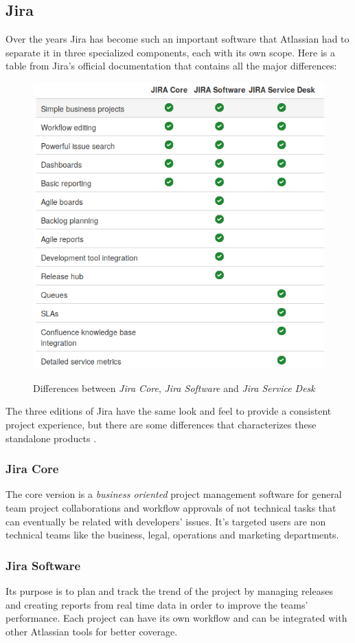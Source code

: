 	\subsection{Jira}
		Over the years Jira has become such an important software that Atlassian had to separate it in three specialized components, each with its own scope.
		Here is a table from Jira's official documentation \cite{server_jira+jsd_product-changes} that contains all the major differences:
		\begin{figure}[H]
			\centering
			\includegraphics[width=.8\textwidth]{resources/jira_type}\\
			\caption{Differences between \textit{Jira Core}, \textit{Jira Software} and \textit{Jira Service Desk}}
		\end{figure}
		The three editions of Jira have the same look and feel to provide a consistent project experience, but there are some differences that characterizes these standalone products \cite{what-are-the-differences}.
		\subsubsection{Jira Core}
			The core version is a \textit{business oriented} project management software for general team project collaborations and workflow approvals of not technical tasks that can eventually be related with developers' issues.
			It's targeted users are non technical teams like the business, legal, operations and marketing departments.
			
		\subsubsection{Jira Software}
			Its purpose is to plan and track the trend of the project by managing releases and creating reports from real time data in order to improve the teams' performance.
			Each project can have its own workflow and can be integrated with other Atlassian tools for better coverage.
		
